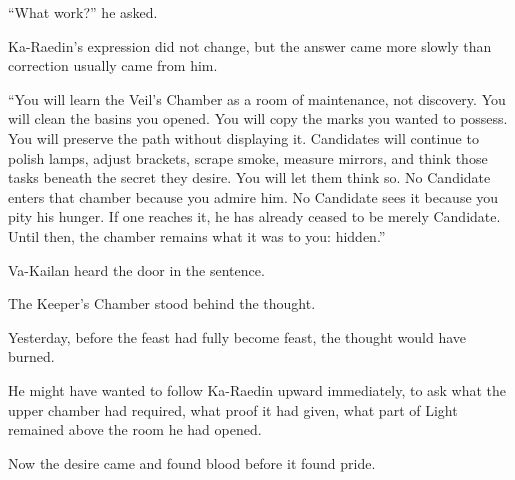 “What work?” he asked.\par
Ka-Raedin’s expression did not change, but the answer came more slowly than correction usually came from him.\par
“You will learn the Veil’s Chamber as a room of maintenance, not discovery.
You will clean the basins you opened.
You will copy the marks you wanted to possess.
You will preserve the path without displaying it.
Candidates will continue to polish lamps, adjust brackets, scrape smoke, measure mirrors, and think those tasks beneath the secret they desire.
You will let them think so.
No Candidate enters that chamber because you admire him.
No Candidate sees it because you pity his hunger.
If one reaches it, he has already ceased to be merely Candidate.
Until then, the chamber remains what it was to you: hidden.”\par
Va-Kailan heard the door in the sentence.\par

The Keeper’s Chamber stood behind the thought.\par
Yesterday, before the feast had fully become feast, the thought would have burned.\par
He might have wanted to follow Ka-Raedin upward immediately, to ask what the upper chamber had required, what proof it had given, what part of Light remained above the room he had opened.\par
Now the desire came and found blood before it found pride.\par

